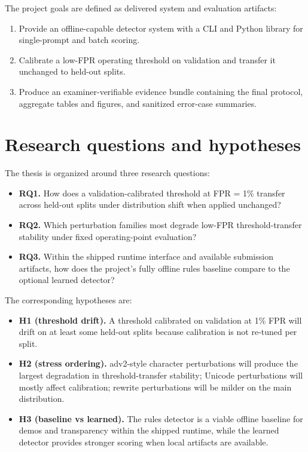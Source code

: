 The project goals are defined as delivered system and evaluation artifacts:
\begin{enumerate}
  \item Provide an offline-capable detector system with a CLI and Python library for single-prompt and batch scoring.
  \item Calibrate a low-FPR operating threshold on validation and transfer it unchanged to held-out splits.
  \item Produce an examiner-verifiable evidence bundle containing the final protocol, aggregate tables and figures, and sanitized error-case summaries.
\end{enumerate}

\section{Research questions and hypotheses}

The thesis is organized around three research questions:
\begin{itemize}
  \item \textbf{RQ1.} How does a validation-calibrated threshold at FPR = 1\% transfer across held-out splits under distribution shift when applied unchanged?
  \item \textbf{RQ2.} Which perturbation families most degrade low-FPR threshold-transfer stability under fixed operating-point evaluation?
  \item \textbf{RQ3.} Within the shipped runtime interface and available submission artifacts, how does the project's fully offline rules baseline compare to the optional learned detector?
\end{itemize}

The corresponding hypotheses are:
\begin{itemize}
  \item \textbf{H1 (threshold drift).} A threshold calibrated on validation at 1\% FPR will drift on at least some held-out splits because calibration is not re-tuned per split.
  \item \textbf{H2 (stress ordering).} adv2-style character perturbations will produce the largest degradation in threshold-transfer stability; Unicode perturbations will mostly affect calibration; rewrite perturbations will be milder on the main distribution.
  \item \textbf{H3 (baseline vs learned).} The rules detector is a viable offline baseline for demos and transparency within the shipped runtime, while the learned detector provides stronger scoring when local artifacts are available.
\end{itemize}

